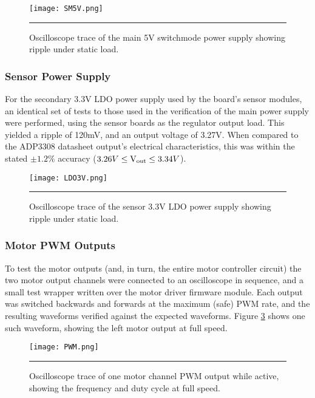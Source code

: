 \begin{figure}[tbph]
	\vspace{1em}
	\centering
		\texttt{[image: SM5V.png]}
	\rule{35em}{0.5pt}
	\caption[Switch-mode 5V Power Supply Oscilloscope Trace]{Oscilloscope trace of the main 5V switchmode power supply showing ripple under static load.}
	\label{fig:mainpowerripple}
\end{figure}

\FloatBarrier
\subsubsection{Sensor Power Supply}

For the secondary 3.3V LDO power supply used by the board's sensor modules, an identical set of tests to those used in the verification of the main power supply were performed, using the sensor boards as the regulator output load. This yielded a ripple of 120mV, and an output voltage of 3.27V. When compared to the ADP3308 datasheet \cite{adp3308} output's electrical characteristics, this was within the stated \(\pm1.2\%\) accuracy (\(3.26V\leq\text{V\ensuremath{_{\textrm{out}}}}\leq3.34V\)).

\begin{figure}[tbph]
	\vspace{1em}
	\centering
		\texttt{[image: LDO3V.png]}
	\rule{35em}{0.5pt}
	\caption[LDO 3.3V Power Supply Oscilloscope Trace]{Oscilloscope trace of the sensor 3.3V LDO power supply showing ripple under static load.}
	\label{fig:sensorpowerripple}
\end{figure}

\FloatBarrier
\subsubsection{Motor PWM Outputs}

To test the motor outputs (and, in turn, the entire motor controller circuit) the two motor output channels were connected to an oscilloscope in sequence, and a small test wrapper written over the motor driver firmware module. Each output was switched backwards and forwards at the maximum (safe) PWM rate, and the resulting waveforms verified against the expected waveforms. Figure \ref{fig:motorpwm} shows one such waveform, showing the left motor output at full speed.

\begin{figure}[tbph]
	\vspace{1em}
	\centering
		\texttt{[image: PWM.png]}
	\rule{35em}{0.5pt}
	\caption[Motor PWM Oscilloscope Trace]{Oscilloscope trace of one motor channel PWM output while active, showing the frequency and duty cycle at full speed.}
	\label{fig:motorpwm}
\end{figure}

